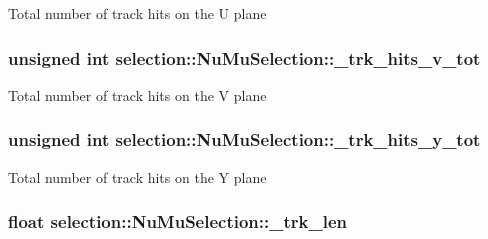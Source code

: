 Total number of track hits on the U plane \hypertarget{classselection_1_1NuMuSelection_adf551288be333a585b4fe8b111b8d3dc}{
\subsubsection[{\-\_\-trk\-\_\-hits\-\_\-v\-\_\-tot}]{\setlength{\rightskip}{0pt plus 5cm}unsigned int selection\-::\-Nu\-Mu\-Selection\-::\-\_\-trk\-\_\-hits\-\_\-v\-\_\-tot\hspace{0.3cm}{\ttfamily [private]}}}\label{classselection_1_1NuMuSelection_adf551288be333a585b4fe8b111b8d3dc}
Total number of track hits on the V plane \hypertarget{classselection_1_1NuMuSelection_a7c0ae4ea16390adf8803846578ad2d05}{
\subsubsection[{\-\_\-trk\-\_\-hits\-\_\-y\-\_\-tot}]{\setlength{\rightskip}{0pt plus 5cm}unsigned int selection\-::\-Nu\-Mu\-Selection\-::\-\_\-trk\-\_\-hits\-\_\-y\-\_\-tot\hspace{0.3cm}{\ttfamily [private]}}}\label{classselection_1_1NuMuSelection_a7c0ae4ea16390adf8803846578ad2d05}
Total number of track hits on the Y plane \hypertarget{classselection_1_1NuMuSelection_ab8df38bd822646f56b672b4f942930a3}{
\subsubsection[{\-\_\-trk\-\_\-len}]{\setlength{\rightskip}{0pt plus 5cm}float selection\-::\-Nu\-Mu\-Selection\-::\-\_\-trk\-\_\-len\hspace{0.3cm}{\ttfamily [private]}}}\label{classselection_1_1NuMuSelection_ab8df38bd822646f56b672b4f942930a3}
